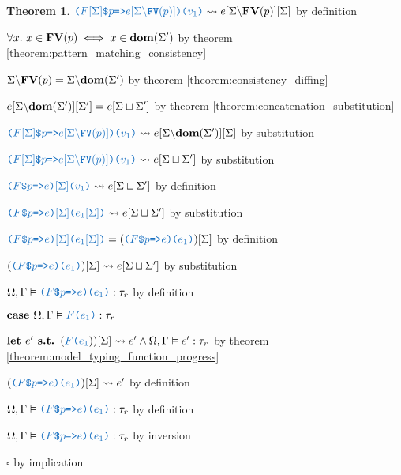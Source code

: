 \documentclass[acmsmall]{acmart}
\theoremstyle{definition}
\newtheorem{theorem}{Theorem}[section]
\begin{document}
\begin{theorem}
      \item \Z\Z $\obj{($F[\Sigma]$\$$p$=>$e[\Sigma\backslash\B{FV}(p)]$)($v_1$)} \rightsquigarrow e[\Sigma\backslash\B{FV}(p)][\Sigma]$ by definition 

      \item \Z\Z $\forall x .\ x \in \textbf{FV}(p) \iff x \in \textbf{dom}(\Sigma')$ 
      by theorem \ref{theorem:pattern_matching_consistency}
      \item \Z\Z $\Sigma\backslash\textbf{FV}(p) = \Sigma\backslash\textbf{dom}(\Sigma')$ 
      by theorem \ref{theorem:consistency_diffing}
      \item \Z\Z $e[\Sigma\backslash\textbf{dom}(\Sigma')][\Sigma'] = e[\Sigma \sqcup \Sigma']$ 
      by theorem \ref{theorem:concatenation_substitution}

      \item \Z\Z $\obj{($F[\Sigma]$\$$p$=>$e[\Sigma\backslash\B{FV}(p)]$)($v_1$)} \rightsquigarrow e[\Sigma\backslash\B{dom}(\Sigma')][\Sigma]$ 
        by substitution
      \item \Z\Z $\obj{($F[\Sigma]$\$$p$=>$e[\Sigma\backslash\B{FV}(p)]$)($v_1$)} \rightsquigarrow e[\Sigma \sqcup \Sigma']$ 
        by substitution 
      \item \Z\Z $\obj{($F$\$$p$=>$e$)$[\Sigma]$($v_1$)} \rightsquigarrow e[\Sigma \sqcup \Sigma']$ by definition 
      \item \Z\Z $\obj{($F$\$$p$=>$e$)$[\Sigma]$($e_1[\Sigma]$)} \rightsquigarrow e[\Sigma \sqcup \Sigma']$ by substitution  

      \item \Z\Z $\obj{($F$\$$p$=>$e$)$[\Sigma]$($e_1[\Sigma]$)} = (\obj{($F$\$$p$=>$e$)($e_1$)})[\Sigma]$ by definition  
      \item \Z\Z $(\obj{($F$\$$p$=>$e$)($e_1$)})[\Sigma] \rightsquigarrow e[\Sigma \sqcup \Sigma']$ by substitution  

      \item \Z\Z $\Omega, \Gamma \satisfies \obj{($F$\$$p$=>$e$)($e_1$)} \hastype \tau_r$ by definition

    \item \Z $\B{case } \Omega, \Gamma \satisfies \obj{$F$($e_1$)} \hastype \tau_r$ 
      \item \Z\Z $\B{let } e' \B{ s.t. } (\obj{$F$($e_1$}))[\Sigma] \rightsquigarrow e' \land \Omega, \Gamma \satisfies e' \hastype \tau_r$ by theorem \ref{theorem:model_typing_function_progress}
      \item \Z\Z $(\obj{($F$\$$p$=>$e$)($e_1$)})[\Sigma] \rightsquigarrow e'$ by definition 
      \item \Z\Z $\Omega, \Gamma \satisfies \obj{($F$\$$p$=>$e$)($e_1$)} \hastype \tau_r$ by definition
    \item \Z $\Omega, \Gamma \satisfies \obj{($F$\$$p$=>$e$)($e_1$)} \hastype \tau_r$ by inversion 
  \item $\square$ by implication
\end{theorem}
\end{document}
